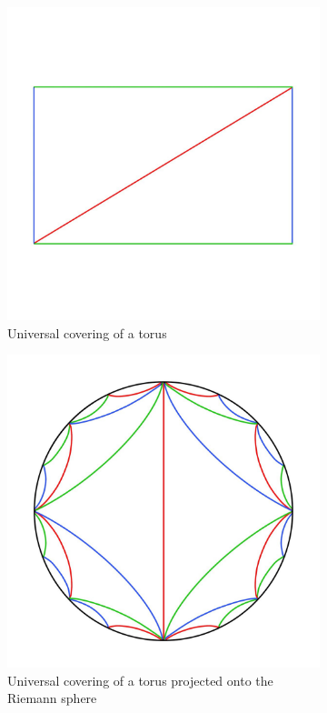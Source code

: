 \documentclass[12pt,a4paper,reqno,parskip=full]{amsart}
\numberwithin{equation}{section}
\theoremstyle{plain}
\theoremstyle{definition}
\begin{document}
\begin{figure}
     \centering
     \captionsetup{justification=centering}
     
     \begin{subfigure}[b]{0.4\textwidth}
         \centering
         \includegraphics[width=\textwidth]{images/Universal Covering.jpg}
         \caption{Universal covering of a torus}
     \end{subfigure}
     \hfill
     \begin{subfigure}[b]{0.4\textwidth}
         \centering
         \includegraphics[width=\textwidth]{images/RS colored detailed.jpg}
         \caption{Universal covering of a torus projected onto the Riemann sphere}
         \label{fig:tesselated}
     \end{subfigure}
        \caption{}
        \label{fig:universal-covering}
\end{figure}
\end{document}
